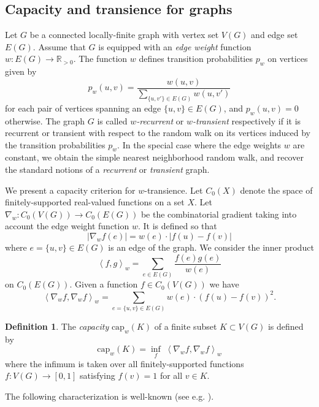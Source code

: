 \documentclass{amsart}
\newcommand{\capacity}[2][]{\mathrm{cap}_{#1}\left(#2\right)}
\theoremstyle{plain}
\numberwithin{equation}{section}
\theoremstyle{definition}
\newtheorem{definition}[theorem]{Definition}
\begin{document}
\subsection{Capacity and transience for graphs}

Let $G$ be a connected locally-finite graph with vertex set $V(G)$ and edge set $E(G)$. Assume that $G$ is equipped with an \emph{edge weight} function $w : E(G) \to \mathbb{R}_{> 0}$. The function $w$ defines  transition probabilities $p_w$ on vertices given by
$$ p_w(u,v) = \frac{w(u,v)}{\sum_{\{u,v'\} \in E(G)} w(u,v')}$$
for each pair of vertices spanning an edge $ \{u,v\} \in E(G)$, and $p_w(u,v) = 0$ otherwise. The graph $G$ is called \emph{$w$-recurrent} or \emph{$w$-transient} respectively if it is recurrent or transient with respect to the random walk on its vertices induced by the transition probabilities $p_w$. In the special case where the edge weights $w$ are constant, we obtain the simple nearest neighborhood random walk, and recover the standard notions of a \emph{recurrent} or \emph{transient} graph.

We present a capacity criterion for $w$-transience. 
Let $C_0(X)$ denote the space of finitely-supported real-valued functions on a set $X$.
Let $ \nabla_w : C_0(V(G)) \to C_0(E(G))$ be the combinatorial gradient taking into account the edge weight function $w$. It is defined so that 
$$|\nabla_w f(e)| = w(e) \cdot |f(u)-f(v)|$$ 
where $e = \{u,v\} \in E(G)$ is an edge of the graph.
We consider the inner product
$$\left<f,g \right>_w = \sum_{e\in E(G)} \frac{f(e)g(e)}{w(e)}$$
on $C_0(E(G))$.
Given a function $f \in C_0(V(G))$ we have
\begin{equation}\label{eq: norm of nabla}
    \left<\nabla_w f, \nabla_w f\right>_w =  \sum_{e=\{u,v\}\in E(G)} w(e) \cdot (f(u) - f(v))^2.
\end{equation}

\begin{definition}
The \emph{capacity} $\capacity[w]{K}$ of a finite subset $K \subset V(G)$ is defined by
\begin{equation}
\capacity[w]{K} =  \inf_f \; \left< \nabla_w f, \nabla_w f\right>_w 
\end{equation}
where the infimum is taken over all finitely-supported functions $f : V(G) \to \left[0,1\right]$ satisfying $f(v) = 1$ for all $v \in K$.
\end{definition}

The following characterization is well-known (see e.g. \cite[Theorem 2.12]{woess2000random}).
\end{document}
